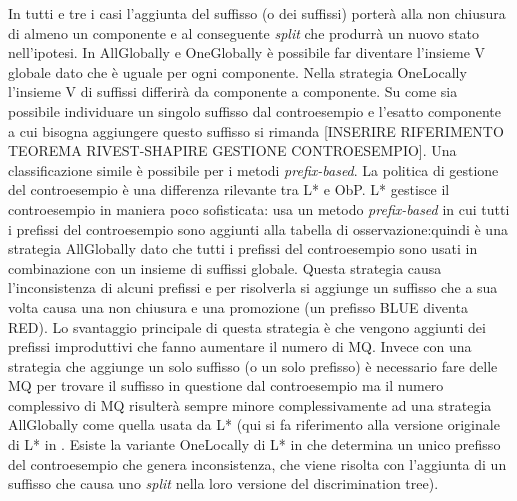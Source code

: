 In tutti e tre i casi l'aggiunta del suffisso (o dei suffissi) porterà alla non chiusura di almeno un componente e al conseguente \textit{split} che produrrà un nuovo stato nell'ipotesi.  In AllGlobally e OneGlobally è possibile far diventare l'insieme V globale dato che è uguale per ogni componente. Nella strategia OneLocally l'insieme V di suffissi differirà da componente a componente. Su come sia possibile individuare un singolo suffisso dal controesempio e l'esatto componente a cui bisogna aggiungere questo suffisso si rimanda [INSERIRE RIFERIMENTO TEOREMA RIVEST-SHAPIRE GESTIONE CONTROESEMPIO].
Una classificazione simile è possibile per i metodi \textit{prefix-based}.
 La politica di gestione del controesempio è una differenza rilevante tra L* e \ac{ObP}. L* gestisce il controesempio in maniera poco sofisticata: usa un metodo \textit{prefix-based} in cui tutti i prefissi del controesempio sono aggiunti alla tabella di osservazione:quindi è una strategia AllGlobally dato che tutti i prefissi del controesempio sono usati in combinazione con un insieme di suffissi globale. Questa strategia causa l'inconsistenza di alcuni prefissi e per risolverla si aggiunge un suffisso che a sua volta causa una non chiusura e una promozione (un prefisso BLUE diventa RED). Lo svantaggio principale di questa strategia è che vengono aggiunti dei prefissi improduttivi che fanno aumentare il numero di \ac{MQ}. Invece con una strategia che aggiunge un solo suffisso (o un solo prefisso) è necessario fare delle \ac{MQ} per trovare il suffisso in questione dal controesempio ma il numero complessivo di \ac{MQ} risulterà sempre minore complessivamente ad una strategia AllGlobally come quella usata da L* (qui si fa riferimento alla versione originale di L* in \cite{Angluin87}. Esiste la variante OneLocally di L* in \cite{Kearns94} che determina un unico prefisso del controesempio  che genera inconsistenza, che viene risolta con l'aggiunta di un suffisso che causa uno \textit{split} nella loro versione del discrimination tree). 

